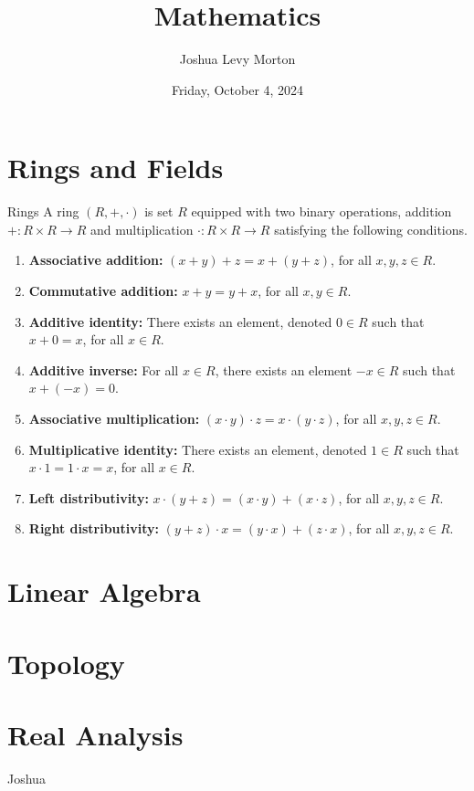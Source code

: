 \documentclass{report}
\title{Mathematics}
\author{Joshua Levy Morton}
\date{Friday, October 4, 2024}
\begin{document}
\maketitle

\tableofcontents

\chapter{Rings and Fields}

\begin{definition}{Rings}{}
    A ring $(R, +, \cdot)$ is set $R$ equipped with two binary operations, addition $+: R \times R \to R$ and multiplication $\cdot: R \times R \to R$ satisfying the following conditions.

    \begin{enumerate}[label=(\roman*)]
        \item \textbf{Associative addition:} $(x + y) + z = x + (y + z)$, for all $x, y, z \in R$.
        \item \textbf{Commutative addition:} $x + y = y + x$, for all $x, y \in R$.
        \item \textbf{Additive identity:} There exists an element, denoted $0 \in R$ such that $x + 0 = x$, for all $x \in R$.
        \item \textbf{Additive inverse:} For all $x \in R$, there exists an element $-x \in R$ such that $x + (-x) = 0$.
        \item \textbf{Associative multiplication:} $(x \cdot y) \cdot z = x \cdot (y \cdot z)$, for all $x, y, z \in R$.
        \item \textbf{Multiplicative identity:} There exists an element, denoted $1 \in R$ such that $x \cdot 1 = 1 \cdot x = x$, for all $x \in R$.
        \item \textbf{Left distributivity:} $x \cdot (y + z) = (x \cdot y) + (x \cdot z)$, for all $x, y, z \in R$.
        \item \textbf{Right distributivity:} $(y + z) \cdot x = (y \cdot x) + (z \cdot x)$, for all $x, y, z \in R$.
      \end{enumerate}

\end{definition}


\chapter{Linear Algebra}
\chapter{Topology}
\chapter{Real Analysis}

Joshua
\end{document}
